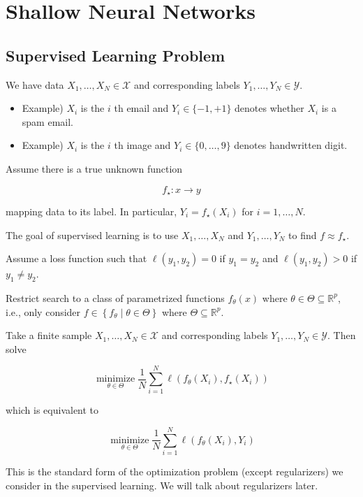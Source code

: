\chapter{Shallow Neural Networks}

\section{Supervised Learning Problem}

\begin{definition}
    We have data $X_{1}, \ldots, X_{N} \in \mathcal{X}$ and corresponding labels $Y_{1}, \ldots, Y_{N} \in \mathcal{Y}$.

    \begin{itemize}
        \item Example) $X_{i}$ is the $i$ th email and $Y_{i} \in\{-1,+1\}$ denotes whether $X_{i}$ is a spam email.
        \item Example) $X_{i}$ is the $i$ th image and $Y_{i} \in\{0, \ldots, 9\}$ denotes handwritten digit.
    \end{itemize}

    Assume there is a true unknown function

    $$
    f_{\star}: x \rightarrow y
    $$

    mapping data to its label. In particular, $Y_{i}=f_{\star}\left(X_{i}\right)$ for $i=1, \ldots, N$.

    The goal of supervised learning is to use $X_{1}, \ldots, X_{N}$ and $Y_{1}, \ldots, Y_{N}$ to find $f \approx f_{\star}$.
\end{definition}

\begin{definition}
    Assume a loss function such that $\ell\left(y_{1}, y_{2}\right)=0$ if $y_{1}=y_{2}$ and $\ell\left(y_{1}, y_{2}\right)>0$ if $y_{1} \neq y_{2}$.

    Restrict search to a class of parametrized functions $f_{\theta}(x)$ where $\theta \in \Theta \subseteq \mathbb{R}^{p}$, i.e., only consider $f \in\left\{f_{\theta} \mid \theta \in \Theta\right\}$ where $\Theta \subseteq \mathbb{R}^{p}$.

    Take a finite sample $X_{1}, \ldots, X_{N} \in \mathcal{X}$ and corresponding labels $Y_{1}, \ldots, Y_{N} \in \mathcal{Y}$. Then solve

    $$
    \underset{\theta \in \Theta}{\operatorname{minimize}} \frac{1}{N} \sum_{i=1}^{N} \ell\left(f_{\theta}\left(X_{i}\right), f_{\star}\left(X_{i}\right)\right)
    $$

    which is equivalent to

    $$
    \underset{\theta \in \Theta}{\operatorname{minimize}} \frac{1}{N} \sum_{i=1}^{N} \ell\left(f_{\theta}\left(X_{i}\right), Y_{i}\right)
    $$

    This is the standard form of the optimization problem (except regularizers) we consider in the supervised learning. We will talk about regularizers later.
\end{definition}

